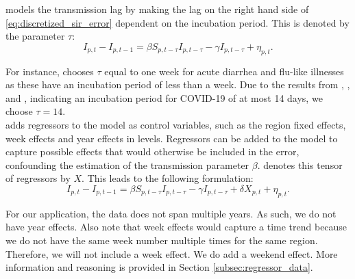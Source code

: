 \documentclass[12pt]{article}
\begin{document}
	\textcite{adda2016economic} models the transmission lag by making the lag on the right hand side of \eqref{eq:discretized_sir_error} dependent on the incubation period. This is denoted by the parameter $\tau$:
	    \begin{equation}\label{eq:discretized_sir_tau}
	        I_{p,t} - I_{p,t-1} = \beta S_{p,t-\tau}I_{p,t-\tau} - \gamma I_{p,t-\tau} + \eta_{p,t}.
	    \end{equation}
	
	For instance, \textcite{adda2016economic} chooses $\tau$ equal to one week for acute diarrhea and flu-like illnesses as these have an incubation period of less than a week. Due to the results from \textcite{lauer2020incubation}, \textcite{li2020incubation}, and \textcite{linton2020incubation}, indicating an incubation period for COVID-19 of at most 14 days, we choose $\tau = 14$. \\
	
	\textcite{adda2016economic} adds regressors to the model as control variables, such as the region fixed effects, week effects and year effects in levels. Regressors can be added to the model to capture possible effects that would otherwise be included in the error, confounding the estimation of the transmission parameter $\beta$. \textcite{adda2016economic} denotes this tensor of regressors by $X$. This leads to the following formulation:
	    \begin{equation}\label{eq:discretized_sir_regressors}
        	I_{p,t} - I_{p,t-1} = \beta S_{p,t-\tau}I_{p,t-\tau} - \gamma I_{p,t-\tau} + \delta X_{p,t} + \eta_{p,t}.
    	\end{equation}
    	
	For our application, the data does not span multiple years. As such, we do not have year effects. Also note that week effects would capture a time trend because we do not have the same week number multiple times for the same region. Therefore, we will not include a week effect. We do add a weekend effect. More information and reasoning is provided in Section \ref{subsec:regressor_data}. \\
	
\end{document}
